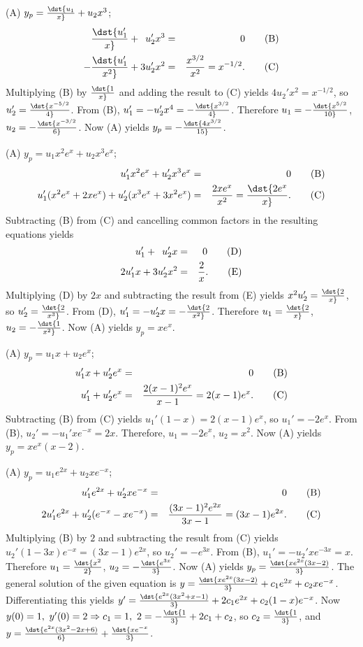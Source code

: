 \documentclass[dvips]{book}
\renewcommand{\exer}[1]{\par\medskip\;\noindent{\color{red}\bf #1.}}
\numberwithin{example}{section}
\numberwithin{equation}{section}
\numberwithin{theorem}{section}
\numberwithin{table}{section}
\numberwithin{figure}{section}
\begin{document}
\exer{5.7.24}
(A) $y_p=\dst{u_1\over x}+u_2x^3$;\;
\begin{eqnarray*}
\phantom{-}\dst{u_1'\over
x}+\phantom{3}u_2'x^3&=&0\qquad\text{(B)}\\ %
-\dst{u_1'\over x^2}+3u_2'x^2&=&{x^{3/2}\over
x^2}=x^{-1/2}. \qquad\text{(C)}%
\end{eqnarray*}
Multiplying (B) by $\dst{1\over x}$ and
adding the result to (C) yields
$4u_2'x^2=x^{-1/2}$, so $u_2'=\dst{x^{-5/2}\over4}$. From
(B), $u_1'=-u_2'x^4=-\dst{x^{3/2}\over4}$.
Therefore $u_1=-\dst{x^{5/2}\over10}$, $u_2=-\dst{x^{-3/2}\over6}$.
Now (A) yields $y_p=-\dst{4x^{3/2}\over15}$.


\exer{5.7.26}
(A) $y_p=u_1x^2e^x+u_2x^3e^x$;\;
\begin{eqnarray*}
u_1'x^2e^x+u_2'x^3e^x&=&0\qquad\text{(B)}\\ %
u_1'(x^2e^x+2xe^x)+u_2'(x^3e^x+3x^2e^x)&=&{2xe^x\over
x^2}=\dst{2e^x\over x}.\qquad\text{(C)} %
\end{eqnarray*}
Subtracting (B) from (C)
and cancelling common factors in the resulting equations
yields
\begin{eqnarray*}
\phantom{2x}u_1'+\phantom{3}u_2'x&=&0\qquad\text{(D)}\\ %
2u_1'x+3u_2'x^2&=&{2\over x}.\qquad\text{(E)} %
\end{eqnarray*}
Multiplying (D) by $2x$ and subtracting the result
from (E) yields $x^2u_2'=\dst{2\over x}$, so
$u_2'=\dst{2\over x^3}$. From (D),
$u_1'=-u_2'x=-\dst{2\over x^2}$. Therefore $u_1=\dst{2\over x}$,
$u_2=-\dst{1\over x^2}$. Now (A) yields $y_p=xe^x$.


\exer{5.7.28}
(A) $y_p=u_1x+u_2e^x$;\;
\begin{eqnarray*}
u_1'x+u_2'e^x&=&0\qquad\text{(B)}\\ %
u_1'+u_2'e^x&=&{2(x-1)^2e^x\over
x-1}=2(x-1)e^x.\qquad\text{(C)} %
\end{eqnarray*}
Subtracting (B) from (C)
yields $u_1'(1-x)=2(x-1)e^x$, so $u_1'=-2e^x$. From
(B), $u_2'=-u_1'xe^{-x}=2x$. Therefore,
$u_1=-2e^x$, $u_2=x^2$. Now (A) yields $y_p=xe^x(x-2)$.



\exer{5.7.30}
(A) $y_p=u_1e^{2x}+u_2xe^{-x}$;
\setcounter{equation}{1}
\begin{eqnarray*}
u_1'e^{2x}+u_2'xe^{-x}&=&0\qquad\text{(B)}\\ %
2u_1'e^{2x}+u_2'(e^{-x}-xe^{-x})&=&{(3x-1)^2e^{2x}\over
3x-1}=(3x-1)e^{2x}.\qquad\text{(C)} %
\end{eqnarray*}
Multiplying (B) by $2$ and subtracting the result
from (C) yields $u_2'(1-3x)e^{-x}=(3x-1)e^{2x}$, so
$u_2'=-e^{3x}$. From (B), $u_1'=-u_2'xe^{-3x}=x$.
Therefore $u_1=\dst{x^2\over2}$, $u_2=-\dst{e^{3x}\over3}$. Now (A)
yields $y_p=\dst{xe^{2x}(3x-2)\over3}$. The general solution of the
given equation is $y=\dst{xe^{2x}(3x-2)\over3}+c_1e^{2x}+c_2xe^{-x}$.
Differentiating this yields
$y'=\dst{e^{2x}(3x^2+x-1)\over3}+2c_1e^{2x}+c_2(1-x)e^{-x}$. Now
$y(0)=1,\ y'(0)=2\Rightarrow c_1=1,\ 2=-\dst{1\over3} +2c_1+c_2$, so
$c_2=\dst{1\over3}$, and
$y=\dst{e^{2x}(3x^2-2x+6)\over6}+\dst{xe^{-x}\over3}$.
\end{document}
